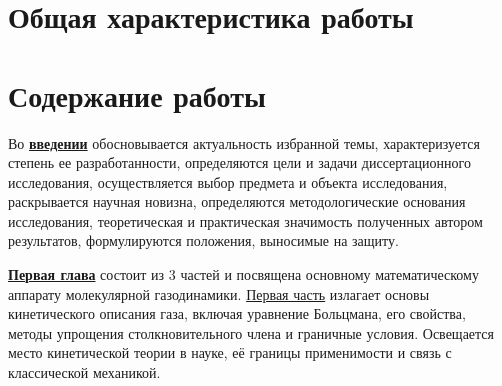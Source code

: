 
\section*{Общая характеристика работы}

\newcommand{\actuality}{\underline{\textbf{\actualityTXT}}}
\newcommand{\progress}{\underline{\textbf{\progressTXT}}}
\newcommand{\aim}{\underline{{\textbf\aimTXT}}}
\newcommand{\tasks}{\underline{\textbf{\tasksTXT}}}
\newcommand{\novelty}{\underline{\textbf{\noveltyTXT}}}
\newcommand{\influence}{\underline{\textbf{\influenceTXT}}}
\newcommand{\methods}{\underline{\textbf{\methodsTXT}}}
\newcommand{\defpositions}{\underline{\textbf{\defpositionsTXT}}}
\newcommand{\reliability}{\underline{\textbf{\reliabilityTXT}}}
\newcommand{\probation}{\underline{\textbf{\probationTXT}}}
\newcommand{\contribution}{\underline{\textbf{\contributionTXT}}}
\newcommand{\publications}{\underline{\textbf{\publicationsTXT}}}
\newcommand{\object}{\underline{\textbf{\objectTXT}}}
\newcommand{\subject}{\underline{\textbf{\subjectTXT}}}




\section*{Содержание работы}

Во \underline{\textbf{введении}} обосновывается актуальность избранной темы, характеризуется степень ее разработанности,
определяются цели и задачи диссертационного исследования, осуществляется выбор предмета и объекта исследования,
раскрывается научная новизна, определяются методологические основания исследования,
теоретическая и практическая значимость полученных автором результатов,
формулируются положения, выносимые на защиту.

\underline{\textbf{Первая глава}} состоит из 3 частей и посвящена основному математическому аппарату молекулярной газодинамики.
\underline{Первая часть} излагает основы кинетического описания газа,
включая уравнение Больцмана, его свойства, методы упрощения столкновительного члена и граничные условия.
Освещается место кинетической теории в науке, её границы применимости и связь с классической механикой.

